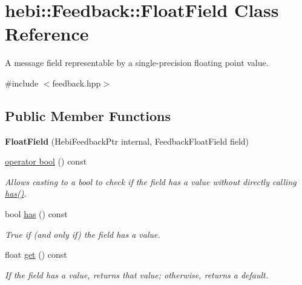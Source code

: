 \hypertarget{classhebi_1_1Feedback_1_1FloatField}{}\section{hebi\+:\+:Feedback\+:\+:Float\+Field Class Reference}
\label{classhebi_1_1Feedback_1_1FloatField}


A message field representable by a single-\/precision floating point value.  




{\ttfamily \#include $<$feedback.\+hpp$>$}

\subsection*{Public Member Functions}
\begin{DoxyCompactItemize}
\item 
\mbox{\label{classhebi_1_1Feedback_1_1FloatField_a7b39ccd80c26e437dcb144db4e4eed26}} 
{\bfseries Float\+Field} (Hebi\+Feedback\+Ptr internal, Feedback\+Float\+Field field)
\item 
\hyperlink{classhebi_1_1Feedback_1_1FloatField_a3321ad9483e45f5871ee8af9c43e4828}{operator bool} () const
\begin{DoxyCompactList}\small\item\em Allows casting to a bool to check if the field has a value without directly calling {\ttfamily \hyperlink{classhebi_1_1Feedback_1_1FloatField_ac9fc1fc4ad1d2902395bf6113ceea93e}{has()}}. \end{DoxyCompactList}\item 
\mbox{\label{classhebi_1_1Feedback_1_1FloatField_ac9fc1fc4ad1d2902395bf6113ceea93e}} 
bool \hyperlink{classhebi_1_1Feedback_1_1FloatField_ac9fc1fc4ad1d2902395bf6113ceea93e}{has} () const
\begin{DoxyCompactList}\small\item\em True if (and only if) the field has a value. \end{DoxyCompactList}\item 
\mbox{\label{classhebi_1_1Feedback_1_1FloatField_a3d4c178c25e02767abbdc4dfc8bc990f}} 
float \hyperlink{classhebi_1_1Feedback_1_1FloatField_a3d4c178c25e02767abbdc4dfc8bc990f}{get} () const
\begin{DoxyCompactList}\small\item\em If the field has a value, returns that value; otherwise, returns a default. \end{DoxyCompactList}\end{DoxyCompactItemize}


